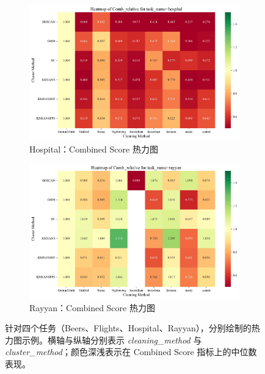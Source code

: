 \documentclass[10pt]{article} %
\numberwithin{equation}{section}
\begin{document}
\begin{enumerate}[label=(\alph*)]
\begin{figure}[htbp]
    \vspace{1em} %

    \begin{subfigure}[b]{0.45\linewidth}
        \centering
        \includegraphics[width=\linewidth]{figures/heatmap/heatmap_hospital_Comb_relative.pdf}
        \caption{Hospital：Combined Score 热力图}
        \label{fig:heatmap_hospital}
    \end{subfigure}
    \hfill
    \begin{subfigure}[b]{0.45\linewidth}
        \centering
        \includegraphics[width=\linewidth]{figures/heatmap/heatmap_rayyan_Comb_relative.pdf}
        \caption{Rayyan：Combined Score 热力图}
        \label{fig:heatmap_rayyan}
    \end{subfigure}

    \caption{针对四个任务（Beers、Flights、Hospital、Rayyan），分别绘制的热力图示例。横轴与纵轴分别表示 \textit{cleaning\_method} 与 \textit{cluster\_method}；颜色深浅表示在 Combined Score 指标上的中位数表现。}
    \label{fig:all_heatmaps}
\end{figure}


\end{enumerate}
\end{document}
